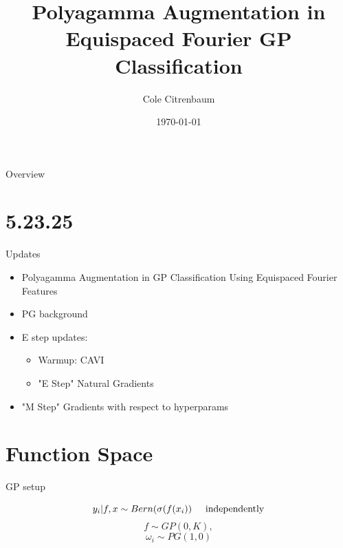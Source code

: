 \documentclass[aspectratio=169,xcolor=dvipsnames]{beamer}
\title{Polyagamma Augmentation in Equispaced Fourier GP Classification}
\author{Cole Citrenbaum}
\institute
{
}
\date{\today} %
\begin{document}
\begin{frame}
    \titlepage
\end{frame}

\begin{frame}{Overview}
    \tableofcontents
\end{frame}

\section{5.23.25}

\begin{frame}{Updates}
    \begin{itemize}
        \item Polyagamma Augmentation in GP Classification Using Equispaced Fourier Features
        \item PG background
        \item E step updates:
        \begin{itemize}
            \item Warmup: CAVI 
            \item "E Step" Natural Gradients
            \end{itemize}
            \item "M Step" Gradients with respect to hyperparams

    \end{itemize}
\end{frame}
\section{Function Space}

\begin{frame}{GP setup}
   
    $$y_i|f,x \sim Bern(\sigma(f(x_i)) \hspace{0.5cm}\text{independently}$$
     $$f\sim GP(0,K),$$
    $$\omega_i \sim PG(1,0)$$
\end{frame}
\end{document}
